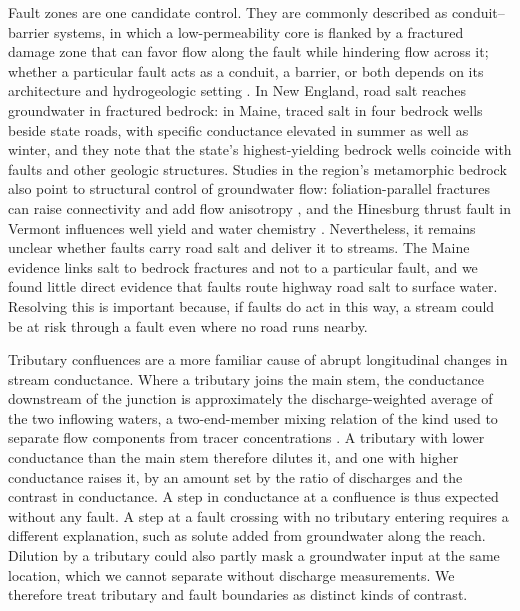 \documentclass{article}
\begin{document}
Fault zones are one candidate control. They are commonly described as conduit--barrier systems, in which a low-permeability core is flanked by a fractured damage zone that can favor flow along the fault while hindering flow across it; whether a particular fault acts as a conduit, a barrier, or both depends on its architecture and hydrogeologic setting \citep{caine1996,bense2013}. In New England, road salt reaches groundwater in fractured bedrock: in Maine, \citet{schalk2012} traced salt in four bedrock wells beside state roads, with specific conductance elevated in summer as well as winter, and they note that the state's highest-yielding bedrock wells coincide with faults and other geologic structures. Studies in the region's metamorphic bedrock also point to structural control of groundwater flow: foliation-parallel fractures can raise connectivity and add flow anisotropy \citep{manda2008}, and the Hinesburg thrust fault in Vermont influences well yield and water chemistry \citep{kim2014}. Nevertheless, it remains unclear whether faults carry road salt and deliver it to streams. The Maine evidence links salt to bedrock fractures and not to a particular fault, and we found little direct evidence that faults route highway road salt to surface water. Resolving this is important because, if faults do act in this way, a stream could be at risk through a fault even where no road runs nearby.

Tributary confluences are a more familiar cause of abrupt longitudinal changes in stream conductance. Where a tributary joins the main stem, the conductance downstream of the junction is approximately the discharge-weighted average of the two inflowing waters, a two-end-member mixing relation of the kind used to separate flow components from tracer concentrations \citep{genereux1998}. A tributary with lower conductance than the main stem therefore dilutes it, and one with higher conductance raises it, by an amount set by the ratio of discharges and the contrast in conductance. A step in conductance at a confluence is thus expected without any fault. A step at a fault crossing with no tributary entering requires a different explanation, such as solute added from groundwater along the reach. Dilution by a tributary could also partly mask a groundwater input at the same location, which we cannot separate without discharge measurements. We therefore treat tributary and fault boundaries as distinct kinds of contrast.
\end{document}
